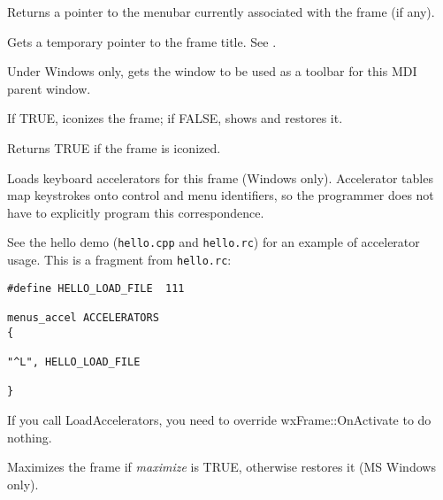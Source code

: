 Returns a pointer to the menubar currently associated with the frame (if any).

\label{wxframegettitle}


Gets a temporary pointer to the frame title. See
.

\label{wxframegettoolbar}


Under Windows only, gets the window to be used as a toolbar for this
MDI parent window. 



If TRUE, iconizes the frame; if FALSE, shows and restores it.



Returns TRUE if the frame is iconized.



Loads keyboard accelerators for this frame (Windows only). Accelerator
tables map keystrokes onto control and menu identifiers, so the
programmer does not have to explicitly program this correspondence.

See the hello demo ({\tt hello.cpp} and {\tt hello.rc}) for
an example of accelerator usage. This is a fragment from {\tt hello.rc}:

\begin{verbatim}
#define HELLO_LOAD_FILE  111

menus_accel ACCELERATORS
{

"^L", HELLO_LOAD_FILE

}
\end{verbatim}

If you call LoadAccelerators, you need to override wxFrame::OnActivate to do nothing.



Maximizes the frame if {\it maximize} is TRUE, otherwise restores it
(MS Windows only).


